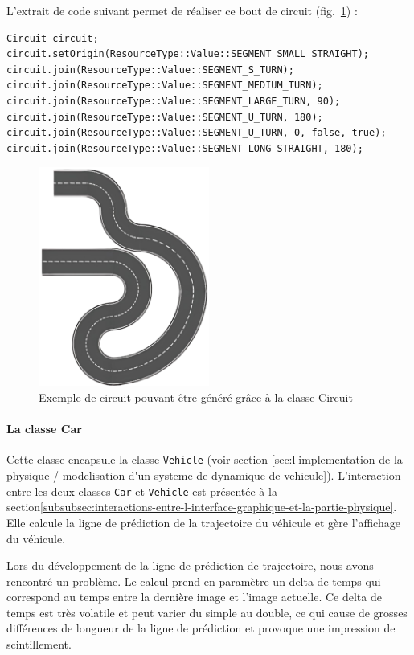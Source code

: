 L'extrait de code suivant permet de réaliser ce bout de circuit (fig.~\ref{fig:example_circuit_1}) :
\begin{lstlisting}[style=CStyle, label={lst:code_circuit}]
Circuit circuit;
circuit.setOrigin(ResourceType::Value::SEGMENT_SMALL_STRAIGHT);
circuit.join(ResourceType::Value::SEGMENT_S_TURN);
circuit.join(ResourceType::Value::SEGMENT_MEDIUM_TURN);
circuit.join(ResourceType::Value::SEGMENT_LARGE_TURN, 90);
circuit.join(ResourceType::Value::SEGMENT_U_TURN, 180);
circuit.join(ResourceType::Value::SEGMENT_U_TURN, 0, false, true);
circuit.join(ResourceType::Value::SEGMENT_LONG_STRAIGHT, 180);
\end{lstlisting}

\begin{figure}[h]
    \centering
    \includegraphics[width=0.5\textwidth]{resources/example_circuit_1}
    \caption{Exemple de circuit pouvant être généré grâce à la classe Circuit}
    \label{fig:example_circuit_1}
\end{figure}

\paragraph[Car]{La classe \textbf{Car}}
Cette classe encapsule la classe \texttt{Vehicle} (voir section \ref{sec:l'implementation-de-la-physique-/-modelisation-d'un-systeme-de-dynamique-de-vehicule}).
L'interaction entre les deux classes \texttt{Car} et \texttt{Vehicle} est présentée à la section\ref{subsubsec:interactions-entre-l-interface-graphique-et-la-partie-physique}.
Elle calcule la ligne de prédiction de la trajectoire du véhicule et gère l'affichage du véhicule.

Lors du développement de la ligne de prédiction de trajectoire, nous avons rencontré un problème.
Le calcul prend en paramètre un delta de temps qui correspond au temps entre la dernière image et l'image actuelle.
Ce delta de temps est très volatile et peut varier du simple au double, ce qui cause de grosses différences de longueur de la ligne de prédiction et provoque une impression de scintillement.

